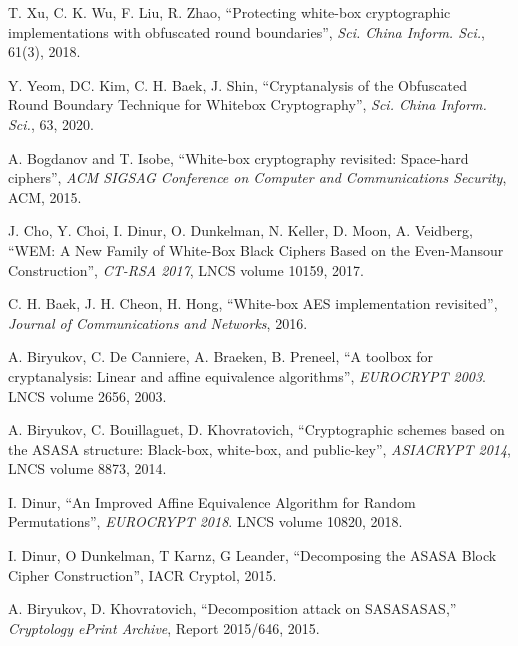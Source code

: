 \documentclass{ieeeaccess}
\begin{document}
\begin{thebibliography}{00}
T. Xu, C. K. Wu, F. Liu, R. Zhao, 
``Protecting white-box cryptographic implementations with obfuscated round boundaries'', 
\emph{Sci. China Inform. Sci.}, 61(3), 2018.

Y. Yeom, DC. Kim, C. H. Baek, J. Shin, 
``Cryptanalysis of the Obfuscated Round Boundary Technique for Whitebox Cryptography'', 
\emph{Sci. China Inform. Sci.}, 63, 2020.

A. Bogdanov and T. Isobe, 
``White-box cryptography revisited: Space-hard ciphers'', 
\emph{ACM SIGSAG Conference on Computer and Communications Security}, ACM, 2015.

J. Cho, Y. Choi, I. Dinur, O. Dunkelman, N. Keller, D. Moon, A. Veidberg, 
``WEM: A New Family of White-Box Black Ciphers Based on the Even-Mansour Construction'', 
\emph{CT-RSA 2017}, LNCS volume 10159, 2017.

 C. H. Baek, J. H. Cheon, H. Hong, 
 ``White-box AES implementation revisited'', 
 \emph{Journal of Communications and Networks}, 2016.
 
A. Biryukov, C. De Canniere, A. Braeken, B. Preneel, 
``A toolbox for cryptanalysis: Linear and affine equivalence algorithms'', 
\emph{EUROCRYPT 2003}. LNCS volume 2656, 2003.

A. Biryukov, C. Bouillaguet, D. Khovratovich, 
``Cryptographic schemes based on the ASASA structure: Black-box, white-box, and public-key'', 
\emph{ASIACRYPT 2014}, LNCS volume 8873, 2014.

I. Dinur, 
``An Improved Affine Equivalence Algorithm for Random Permutations'', 
\emph{EUROCRYPT 2018}. LNCS volume 10820, 2018.

I. Dinur, O Dunkelman, T Karnz, G Leander, 
``Decomposing the ASASA Block Cipher Construction'', IACR Cryptol, 2015.

A. Biryukov, D. Khovratovich, 
``Decomposition attack on SASASASAS,'' 
\emph{Cryptology ePrint Archive}, Report 2015/646, 2015.




\end{thebibliography}

\EOD
\end{document}
